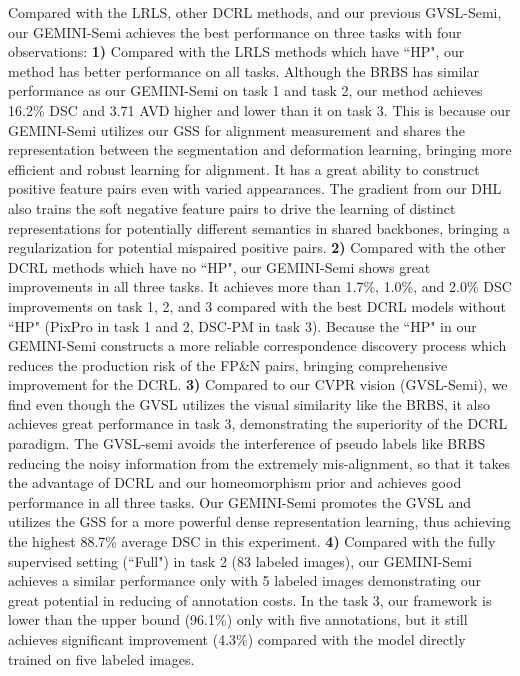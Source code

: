 Compared with the LRLS, other DCRL methods, and our previous GVSL-Semi, our GEMINI-Semi achieves the best performance on three tasks with four observations: \textbf{1)} Compared with the LRLS methods which have ``HP", our method has better performance on all tasks. Although the BRBS has similar performance as our GEMINI-Semi on task 1 and task 2, our method achieves 16.2\% DSC and 3.71 AVD higher and lower than it on task 3. This is because our GEMINI-Semi utilizes our GSS for alignment measurement and shares the representation between the segmentation and deformation learning, bringing more efficient and robust learning for alignment. It has a great ability to construct positive feature pairs even with varied appearances. The gradient from our DHL also trains the soft negative feature pairs to drive the learning of distinct representations for potentially different semantics in shared backbones, bringing a regularization for potential mispaired positive pairs. \textbf{2)} Compared with the other DCRL methods which have no ``HP", our GEMINI-Semi shows great improvements in all three tasks. It achieves more than 1.7\%, 1.0\%, and 2.0\% DSC improvements on task 1, 2, and 3 compared with the best DCRL models without ``HP" (PixPro in task 1 and 2, DSC-PM in task 3). Because the ``HP" in our GEMINI-Semi constructs a more reliable correspondence discovery process which reduces the production risk of the FP\&N pairs, bringing comprehensive improvement for the DCRL. \textbf{3)} Compared to our CVPR vision (GVSL-Semi), we find even though the GVSL utilizes the visual similarity like the BRBS, it also achieves great performance in task 3, demonstrating the superiority of the DCRL paradigm. The GVSL-semi avoids the interference of pseudo labels like BRBS reducing the noisy information from the extremely mis-alignment, so that it takes the advantage of DCRL and our homeomorphism prior and achieves good performance in all three tasks. Our GEMINI-Semi promotes the GVSL and utilizes the GSS for a more powerful dense representation learning, thus achieving the highest 88.7\% average DSC in this experiment. \textbf{4)} Compared with the fully supervised setting (``Full") in task 2 (83 labeled images), our GEMINI-Semi achieves a similar performance only with 5 labeled images demonstrating our great potential in reducing of annotation costs. In the task 3, our framework is lower than the upper bound (96.1\%) only with five annotations, but it still achieves significant improvement (4.3\%) compared with the model directly trained on five labeled images.

